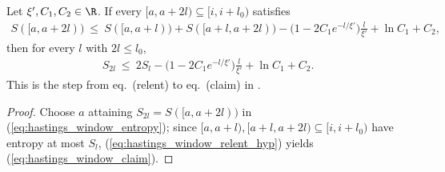 \begin{lemma}
    \label{thm:hastings_window_claim_of_relent}
    \leanok
    Let $\xi',C_1,C_2\in\R$. If every $\lbrack a,a+2l)\subseteq\lbrack i,i+l_0)$
    satisfies
    \begin{align}
        S(\lbrack a,a+2l))\ \le\ S(\lbrack a,a+l))+S(\lbrack a+l,a+2l))
        -\bigl(1-2C_1e^{-l/\xi'}\bigr)\frac{l}{\xi'}+\ln C_1+C_2 ,
        \label{eq:hastings_window_relent_hyp}
    \end{align}
    then for every $l$ with $2l\le l_0$,
    \begin{align}
        S_{2l}\ \le\ 2S_l-\bigl(1-2C_1e^{-l/\xi'}\bigr)\frac{l}{\xi'}+\ln C_1+C_2 .
        \label{eq:hastings_window_claim}
    \end{align}
    This is the step from eq.~(relent) to eq.~(claim) in
    \cite[lines 201--204 and 234--242]{Hastings2007AreaLaw}.
\end{lemma}

\begin{proof}
    \leanok
    Choose $a$ attaining $S_{2l}=S(\lbrack a,a+2l))$ in
    (\ref{eq:hastings_window_entropy}); since
    $\lbrack a,a+l),\lbrack a+l,a+2l)\subseteq\lbrack i,i+l_0)$ have entropy at
    most $S_l$, (\ref{eq:hastings_window_relent_hyp}) yields
    (\ref{eq:hastings_window_claim}).
\end{proof}
